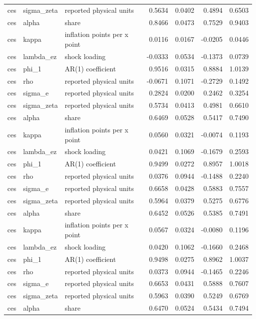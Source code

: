 \begin{tabular}{lllrrrr}
ces & sigma\_zeta & reported physical units & 0.5634 & 0.0402 & 0.4894 & 0.6503 \\
ces & alpha & share & 0.8466 & 0.0473 & 0.7529 & 0.9403 \\
ces & kappa & inflation points per x point & 0.0116 & 0.0167 & -0.0205 & 0.0446 \\
ces & lambda\_ez & shock loading & -0.0333 & 0.0534 & -0.1373 & 0.0739 \\
ces & phi\_1 & AR(1) coefficient & 0.9516 & 0.0315 & 0.8884 & 1.0139 \\
ces & rho & reported physical units & -0.0671 & 0.1071 & -0.2729 & 0.1492 \\
ces & sigma\_e & reported physical units & 0.2824 & 0.0200 & 0.2462 & 0.3254 \\
ces & sigma\_zeta & reported physical units & 0.5734 & 0.0413 & 0.4981 & 0.6610 \\
ces & alpha & share & 0.6469 & 0.0528 & 0.5417 & 0.7490 \\
ces & kappa & inflation points per x point & 0.0560 & 0.0321 & -0.0074 & 0.1193 \\
ces & lambda\_ez & shock loading & 0.0421 & 0.1069 & -0.1679 & 0.2593 \\
ces & phi\_1 & AR(1) coefficient & 0.9499 & 0.0272 & 0.8957 & 1.0018 \\
ces & rho & reported physical units & 0.0376 & 0.0944 & -0.1488 & 0.2240 \\
ces & sigma\_e & reported physical units & 0.6658 & 0.0428 & 0.5883 & 0.7557 \\
ces & sigma\_zeta & reported physical units & 0.5964 & 0.0379 & 0.5275 & 0.6776 \\
ces & alpha & share & 0.6452 & 0.0526 & 0.5385 & 0.7491 \\
ces & kappa & inflation points per x point & 0.0567 & 0.0324 & -0.0080 & 0.1196 \\
ces & lambda\_ez & shock loading & 0.0420 & 0.1062 & -0.1660 & 0.2468 \\
ces & phi\_1 & AR(1) coefficient & 0.9498 & 0.0275 & 0.8962 & 1.0037 \\
ces & rho & reported physical units & 0.0373 & 0.0944 & -0.1465 & 0.2246 \\
ces & sigma\_e & reported physical units & 0.6653 & 0.0431 & 0.5888 & 0.7607 \\
ces & sigma\_zeta & reported physical units & 0.5963 & 0.0390 & 0.5249 & 0.6769 \\
ces & alpha & share & 0.6470 & 0.0524 & 0.5434 & 0.7494 \\

\end{tabular}
